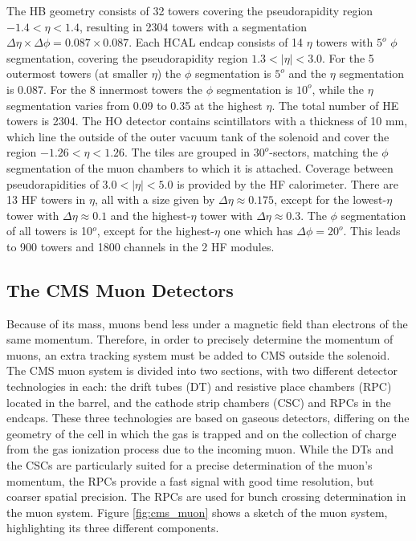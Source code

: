 The HB geometry consists of 32 towers covering the pseudorapidity region $-1.4 < \eta < 1.4$, resulting in 2304 towers with a segmentation $\Delta\eta\times\Delta\phi = 0.087\times0.087$.
Each HCAL endcap consists of 14 $\eta$ towers with $5^{o}$ $\phi$ segmentation, covering the pseudorapidity region $1.3 < |\eta| < 3.0$. 
For the 5 outermost towers (at smaller $\eta$) the $\phi$ segmentation is $5^{o}$ and the $\eta$ segmentation is 0.087. For the 8 innermost towers the $\phi$ segmentation is $10^{o}$, while the $\eta$ segmentation varies from 0.09 to 0.35 at the highest $\eta$. The total number of HE towers is 2304.
The HO detector contains scintillators with a thickness of 10 mm, which line the outside of the outer vacuum tank of the solenoid and cover the region $-1.26 < \eta < 1.26$. The tiles are grouped in $30^{o}$-sectors, matching the $\phi$ segmentation of the muon chambers to which it is attached. 
Coverage between pseudorapidities of $3.0 < |\eta| < 5.0$ is provided by the HF calorimeter. 
There are 13 HF towers in $\eta$, all with a size given by $\Delta\eta\approx0.175$, except for the lowest-$\eta$ tower with $\Delta\eta\approx0.1$ and the highest-$\eta$ tower with $\Delta\eta\approx0.3$. 
The $\phi$ segmentation of all towers is 10$^{o}$, except for the highest-$\eta$ one which has $\Delta\phi= 20^{o}$. 
This leads to 900 towers and 1800 channels in the 2 HF modules.

\subsection{The CMS Muon Detectors}

Because of its mass, muons bend less under a magnetic field than electrons of the same momentum. 
Therefore, in order to precisely determine the momentum of muons, an extra tracking system must be added to CMS outside the solenoid. 
The CMS muon system is divided into two sections, with two different detector technologies in each: the drift tubes (DT) and resistive place chambers (RPC) located in the barrel, and the cathode strip chambers (CSC) and RPCs in the endcaps. 
These three technologies are based on gaseous detectors, differing on the geometry of the cell in which the gas is trapped and on the collection of charge from the gas ionization process due to the incoming muon. 
While the DTs and the CSCs are particularly suited for a precise determination of the muon's momentum, the RPCs provide a fast signal with good time resolution, but coarser spatial precision. 
The RPCs are used for bunch crossing determination in the muon system. 
Figure \ref{fig:cms_muon} shows a sketch of the muon system, highlighting its three different components. 

